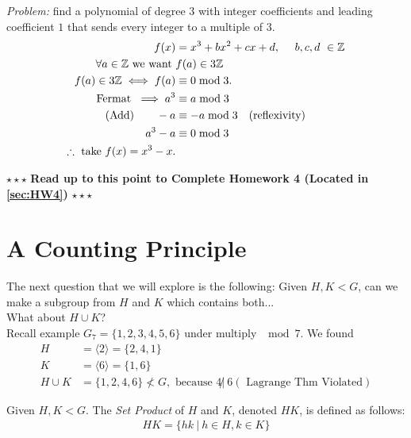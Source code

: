 \begin{example}
\textit{Problem:} find a polynomial of degree $3$ with integer coefficients and leading coefficient $1$ that sends every integer to a multiple of 3.
\begin{align}
    f(x)&=x^3+bx^2+cx+d, \ \ \ \ b,c,d \ \in \Z \nonumber \\
    \forall a \in \Z \text{ we want } &f(a)\in 3\Z \nonumber \\
    f(a)\in 3\Z \iff f(a)&\equiv 0 \mod 3. \nonumber \\
    \text{Fermat } \implies a^3&\equiv a \mod 3  \nonumber \\
    \text{ (Add) }\ \ \ \ \ -a&\equiv -a\mod 3 \ \ \ \text{(reflexivity)}  \nonumber \\
    a^3-a&\equiv 0 \mod 3 \nonumber \\
    \therefore \text{ take } f(x)= x^3 - x. \nonumber 
\end{align}
\end{example}
\steezybreak
\begin{tcolorbox}
\begin{center}
    $\star\star\star$ \textbf{Read up to this point to Complete Homework 4 (Located in \ref{sec:HW4})} $\star\star\star$
\end{center}
\end{tcolorbox}
\newpage
\section{A Counting Principle}
The next question that we will explore is the following: Given $H,K < G$, can we make a subgroup from $H$ and $K$ which contains both...\steezybreak\\

\noindent What about $H\cup K$? \\ 
Recall example $G_7=\{1,2,3,4,5,6\}$ under multiply $\mod 7$. We found 
\begin{align}
    H&=\langle 2 \rangle = \{2,4,1\} \nonumber \\
    K&=\langle 6 \rangle = \{1,6 \} \nonumber \\
    H\cup K &= \{1,2,4,6\} \not < G, \text{ because } 4 \not | \ 6 (\text{ Lagrange Thm Violated}) \nonumber
\end{align}

\begin{definition}
Given $H,K < G$. The \textit{Set Product} of $H$ and $K$, denoted $HK$, is defined as follows:\\
\begin{align}
HK = \{hk \ | \ h\in H,k\in K\} \nonumber
\end{align}
\end{definition}

